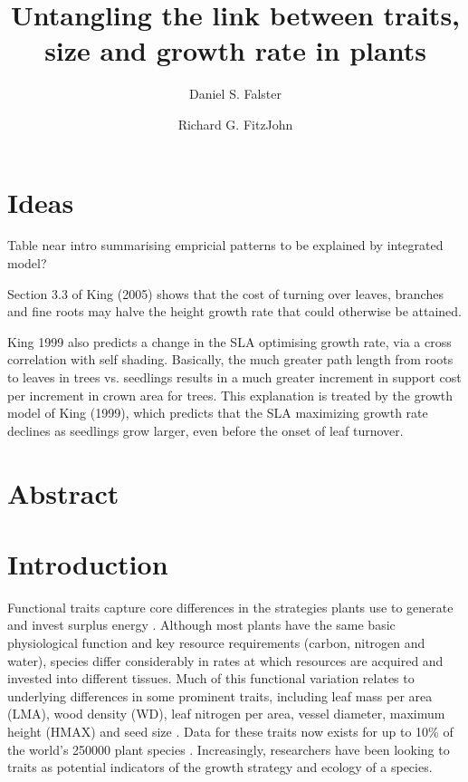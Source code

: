 \documentclass[12pt, a4paper]{article}
\title{\LARGE Untangling the link between traits, size and growth rate in plants}
\author[1]{Daniel S. Falster}
\author[1]{Richard G. FitzJohn}
\affil[1]{{\footnotesize Biological Sciences, Macquarie University, North Ryde, NSW 2109, Australia}}
\date{\vspace{-3em}}
\begin{document}
\maketitle
\thispagestyle{empty} %

\section{Ideas}\label{abstract}

Table near intro summarising empricial patterns to be explained by integrated model?

Section 3.3 of King (2005) shows that the cost of turning over leaves, branches and fine roots may halve the height growth rate that could otherwise be attained.

King 1999 also predicts a change in the SLA optimising growth rate, via a cross correlation with self shading. Basically, the much greater path length from roots to leaves in trees vs. seedlings results in a much greater increment in support cost per increment in crown area for trees. This explanation is treated by the growth model of King (1999), which predicts that the SLA maximizing growth rate declines as seedlings grow larger, even before the onset of leaf turnover.

\section{Abstract}\label{abstract}

\section{Introduction}\label{introduction}

Functional traits capture core differences in the strategies
plants use to generate and invest surplus energy
 \citep{wright-2004, chave-2009, westoby-2002}.
Although most plants have the same basic physiological function
and key resource requirements (carbon, nitrogen and water), species differ considerably in
rates at which resources are acquired and invested into different tissues.
Much of this functional variation relates to underlying
differences in some prominent traits, including leaf
mass per area (LMA), wood density (WD), leaf nitrogen per area, vessel
diameter,  maximum  height (HMAX) and seed size  \citep{wright-2004,chave-2009}.
Data for these traits now exists for up to 10\% of the world's 250000 plant species
\citep{cornwell-2014}. Increasingly, researchers have been looking to traits
as potential indicators of the growth strategy and ecology of a species.
\end{document}
